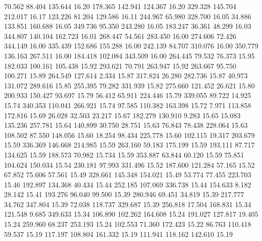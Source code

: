   70.562   88.404  135.644        16.20
 178.365  142.941  124.367        16.20
 329.328  145.704  212.017        16.17
 123.226   81.204  129.586        16.11
 244.967   65.980  328.700        16.05
  34.886  133.851  160.688        16.05
 349.736   95.350  243.280        16.05
 183.247   36.361   48.299        16.03
 344.807  140.104  162.723        16.01
 268.447   54.561  283.450        16.00
 274.606   72.426  344.149        16.00
 335.439  152.686  155.288        16.00
 242.139   84.707  310.076        16.00
 350.779  136.163  267.511        16.00
 184.418  102.084  343.509        16.00
 264.445   79.532   76.373        15.95
 182.033  100.161  105.438        15.92
 293.621   70.791  263.947        15.92
 263.667   95.750  100.271        15.89
 264.549  127.614    2.334        15.87
 317.824   26.280  282.736        15.87
  40.973  131.072  289.616        15.85
 255.395   79.282  331.939        15.82
 275.660  121.452   26.621        15.80
 200.933  150.427   93.697        15.79
  56.412   65.911  224.446        15.79
 339.055   89.722   14.925        15.74
 340.353  110.041  266.921        15.74
  97.585  110.382  163.398        15.72
   7.971  113.858  172.816        15.69
  26.028   32.503   23.217        15.67
 182.279  130.910    9.283        15.65
  15.083  135.236  257.781        15.64
 140.899   30.750   28.751        15.63
  76.843   78.438  228.064        15.63
 108.502   87.550  148.056        15.60
  18.254   98.434  225.778        15.60
 102.115   19.317  203.679        15.59
 336.369  146.668  214.985        15.59
 263.160   59.183  175.199        15.59
 193.111   87.717  134.625        15.59
 188.573   70.982   15.734        15.59
 353.887   63.844   60.120        15.59
  75.851  104.624  150.034        15.54
 230.181   97.993  331.496        15.52
 187.600  121.284   57.165        15.52
  67.852   75.606   57.561        15.49
 328.661  145.348  154.021        15.49
  53.774   77.455  223.703        15.46
 192.897  134.368   40.434        15.44
 252.185  107.069  336.738        15.44
 154.633    8.182   28.142        15.41
 193.276   96.040   99.500        15.39
 280.946   69.451   34.819        15.39
 217.777   34.762  347.804        15.39
  72.038  118.737  329.687        15.39
 256.818   17.504  168.831        15.34
 121.548    9.685  349.633        15.34
 106.890  102.262  164.608        15.24
 191.027  127.817   19.405        15.24
 259.960   68.237  253.193        15.24
 102.553   71.360  172.423        15.22
  86.763  110.418   59.537        15.19
 117.197  108.804  161.332        15.19
 111.941  118.162  142.610        15.19
